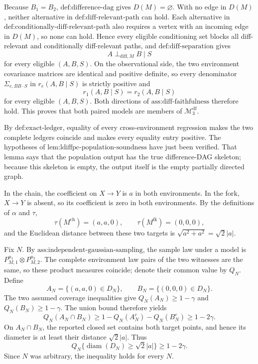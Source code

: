 Because \(B_1=B_2\), \(\text{def:difference-dag}\) gives \(D(M)=\varnothing\).  With no edge in \(D(M)\), neither alternative in \(\text{def:diff-relevant-path}\) can hold.  Each alternative in \(\text{def:conditionally-diff-relevant-path}\) also requires a vertex with an incoming edge in \(D(M)\), so none can hold.  Hence every eligible conditioning set blocks all diff-relevant and conditionally diff-relevant paths, and \(\text{def:diff-separation}\) gives
\[
 A\perp_{\mathrm{diff},M}B\mid S
\]
for every eligible \((A,B,S)\).  On the observational side, the two environment covariance matrices are identical and positive definite, so every denominator \(\Sigma_{e,BB\cdot S}\) in \(r_e(A,B\mid S)\) is strictly positive and
\[
 r_1(A,B\mid S)=r_2(A,B\mid S)
\]
for every eligible \((A,B,S)\).  Both directions of \(\text{ass:diff-faithfulness}\) therefore hold.  This proves that both paired models are members of \(\mathcal M_3^{\mathrm{df}}\).

By \(\text{def:exact-ledger}\), equality of every cross-environment regression makes the two complete ledgers coincide and makes every equality entry positive.  The hypotheses of \(\text{lem:ldiffpc-population-soundness}\) have just been verified.  That lemma says that the population output has the true difference-DAG skeleton; because this skeleton is empty, the output itself is the empty partially directed graph.

In the chain, the coefficient on \(X\to Y\) is \(a\) in both environments.  In the fork, \(X\to Y\) is absent, so its coefficient is zero in both environments.  By the definitions of \(\alpha\) and \(\tau\),
\[
 \tau(M^{\mathrm{ch}})=(a,a,0),\qquad
 \tau(M^{\mathrm{fk}})=(0,0,0),
\]
and the Euclidean distance between these two targets is \(\sqrt{a^2+a^2}=\sqrt2|a|\).

Fix \(N\).  By \(\text{ass:independent-gaussian-sampling}\), the sample law under a model is \(P_{M,1}^{n_1}\otimes P_{M,2}^{n_2}\).  The complete environment law pairs of the two witnesses are the same, so these product measures coincide; denote their common value by \(Q_N\).  Define
\[
 A_N=\{(a,a,0)\in D_N\},\qquad
 B_N=\{(0,0,0)\in D_N\}.
\]
The two assumed coverage inequalities give \(Q_N(A_N)\ge1-\gamma\) and \(Q_N(B_N)\ge1-\gamma\).  The union bound therefore yields
\[
 Q_N(A_N\cap B_N)
 \ge 1-Q_N(A_N^c)-Q_N(B_N^c)
 \ge 1-2\gamma.
\]
On \(A_N\cap B_N\), the reported closed set contains both target points, and hence its diameter is at least their distance \(\sqrt2|a|\).  Thus
\[
 Q_N\{\operatorname{diam}(D_N)\ge\sqrt2|a|\}\ge1-2\gamma.
\]
Since \(N\) was arbitrary, the inequality holds for every \(N\).